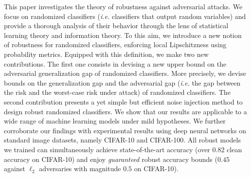 This paper investigates the theory of robustness against adversarial attacks. We focus on randomized classifiers (\emph{i.e.} classifiers that output random variables) and provide a thorough analysis of their behavior through the lens of statistical learning theory and information theory. 
To this aim, we introduce a new notion of robustness for randomized classifiers, enforcing local Lipschitzness using probability metrics.
Equipped with this definition,  we make two  new contributions. The first one consists in devising a new upper bound on the adversarial generalization gap of randomized classifiers. More precisely, we devise bounds on the generalization gap and the adversarial gap (\emph{i.e.} the gap between the risk and the worst-case risk under attack) of randomized classifiers.  
The second contribution presents a yet simple but efficient noise injection method to design robust randomized classifiers. We show that our results are applicable to a wide range of machine learning models under mild hypotheses. We further corroborate our findings with experimental results using deep neural networks on standard image datasets, namely CIFAR-10 and CIFAR-100. All robust models we trained can simultaneously achieve state-of-the-art accuracy (over $0.82$ clean accuracy on CIFAR-10) and enjoy \emph{guaranteed} robust accuracy bounds ($0.45$ against $\ell_2$ adversaries with magnitude $0.5$ on CIFAR-10).


